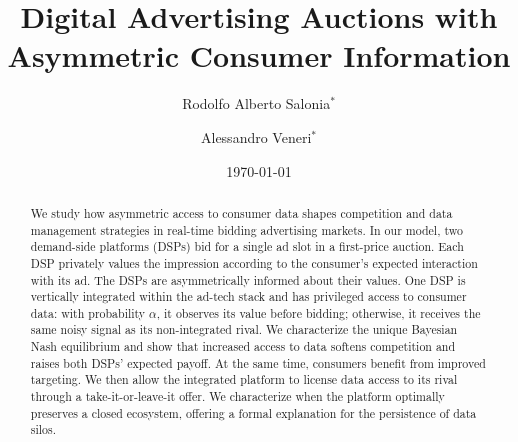 \documentclass[11pt]{article}
\title{Digital Advertising Auctions with Asymmetric Consumer Information}
\date{\today}
\author{Rodolfo Alberto Salonia$^*$ \and Alessandro Veneri$^*$}
\theoremstyle{plain}
\theoremstyle{definition}
\theoremstyle{plain}
\theoremstyle{plain}
\theoremstyle{plain}
\theoremstyle{plain}
\numberwithin{equation}{section}
\begin{document}
\makeatletter
\begin{center}
    {\LARGE{\@mytitle}\par}
\end{center}

\vspace{0.5cm}

\begin{center}
    {\@myauthor\par}
\end{center}

\vspace{0.4cm}

\begin{center}
    {\small\@mydate\par}
\end{center}
\makeatother

\vspace{0.8cm}

\begin{abstract}
We study how asymmetric access to consumer data shapes competition and data management strategies in real-time bidding advertising markets. In our model, two demand-side platforms (DSPs) bid for a single ad slot in a first-price auction. Each DSP privately values the impression according to the consumer’s expected interaction with its ad. The DSPs are asymmetrically informed about their values. One DSP is vertically integrated within the ad-tech stack and has privileged access to consumer data: with probability $ \alpha $, it observes its value before bidding; otherwise, it receives the same noisy signal as its non-integrated rival. We characterize the unique Bayesian Nash equilibrium and show that increased access to data softens competition and raises both DSPs' expected payoff. At the same time, consumers benefit from improved targeting. We then allow the integrated platform to license data access to its rival through a take-it-or-leave-it offer. We characterize when the platform optimally preserves a closed ecosystem, offering a formal explanation for the persistence of data silos.
\end{abstract}

\makeatletter
{}


\vspace*{\fill}
\end{document}
